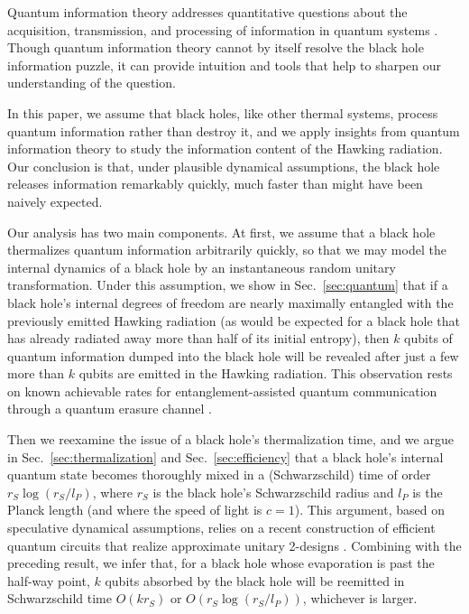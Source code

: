 \documentclass[12pt]{article}
\begin{document}
Quantum information theory addresses quantitative questions about the acquisition, transmission, and processing of information in quantum systems \cite{bennett-shor}. Though quantum information theory cannot by itself resolve the black hole information puzzle, it can provide intuition and tools that help to sharpen our understanding of the question. 

In this paper, we assume that black holes, like other thermal systems, process quantum information rather than destroy it, and we apply insights from quantum information theory to study the information content of the Hawking radiation. Our conclusion is that, under plausible dynamical assumptions, the black hole releases information remarkably quickly, much faster than might have been naively expected.

Our analysis has two main components. At first, we assume that a black hole thermalizes quantum information arbitrarily quickly, so that we may model the internal dynamics of a black hole by an instantaneous random unitary transformation.  Under this assumption, we show in Sec.~\ref{sec:quantum} that if a black hole's internal degrees of freedom are nearly maximally entangled with the previously emitted Hawking radiation (as would be expected for a black hole that has already radiated away more than half of its initial entropy), then $k$ qubits of quantum information dumped into the black hole will be revealed after just a few more than $k$ qubits are emitted in the Hawking radiation. This observation rests on known achievable rates for entanglement-assisted quantum communication through a quantum erasure channel \cite{thapliyal}. 

Then we reexamine the issue of a black hole's thermalization time, and we argue in Sec.~\ref{sec:thermalization} and Sec.~\ref{sec:efficiency} that a black hole's internal quantum state becomes thoroughly mixed in a (Schwarzschild) time of order $r_S\log(r_S/l_{P})$, where $r_S$ is the black hole's Schwarzschild radius and $l_{P}$ is the Planck length (and where the speed of light is $c=1$). This argument, based on speculative dynamical assumptions, relies on a recent construction of efficient quantum circuits that realize approximate unitary 2-designs \cite{cleve,dankert}. Combining with the preceding result, we infer that, for a black hole whose evaporation is past the half-way point, $k$ qubits absorbed by the black hole will be reemitted in Schwarzschild time $O(kr_S)$ or $O(r_S\log(r_S/l_P))$, whichever is larger.
\end{document}
